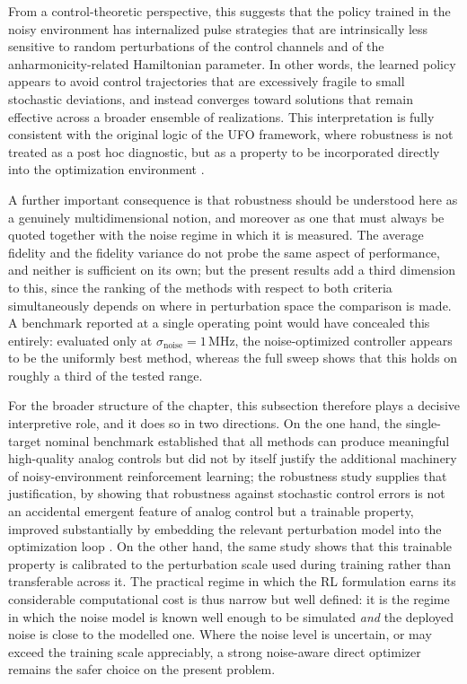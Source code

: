 From a control-theoretic perspective, this suggests that the policy trained in the noisy environment has internalized pulse strategies that are intrinsically less sensitive to random perturbations of the control channels and of the anharmonicity-related Hamiltonian parameter. In other words, the learned policy appears to avoid control trajectories that are excessively fragile to small stochastic deviations, and instead converges toward solutions that remain effective across a broader ensemble of realizations. This interpretation is fully consistent with the original logic of the UFO framework, where robustness is not treated as a post hoc diagnostic, but as a property to be incorporated directly into the optimization environment \cite{Niu2019}.

A further important consequence is that robustness should be understood here as a genuinely multidimensional notion, and moreover as one that must always be quoted together with the noise regime in which it is measured. The average fidelity and the fidelity variance do not probe the same aspect of performance, and neither is sufficient on its own; but the present results add a third dimension to this, since the ranking of the methods with respect to both criteria simultaneously depends on where in perturbation space the comparison is made. A benchmark reported at a single operating point would have concealed this entirely: evaluated only at \(\sigma_{\mathrm{noise}}=1\,\mathrm{MHz}\), the noise-optimized controller appears to be the uniformly best method, whereas the full sweep shows that this holds on roughly a third of the tested range.

For the broader structure of the chapter, this subsection therefore plays a decisive interpretive role, and it does so in two directions. On the one hand, the single-target nominal benchmark established that all methods can produce meaningful high-quality analog controls but did not by itself justify the additional machinery of noisy-environment reinforcement learning; the robustness study supplies that justification, by showing that robustness against stochastic control errors is not an accidental emergent feature of analog control but a trainable property, improved substantially by embedding the relevant perturbation model into the optimization loop \cite{Niu2019}. On the other hand, the same study shows that this trainable property is calibrated to the perturbation scale used during training rather than transferable across it. The practical regime in which the RL formulation earns its considerable computational cost is thus narrow but well defined: it is the regime in which the noise model is known well enough to be simulated \emph{and} the deployed noise is close to the modelled one. Where the noise level is uncertain, or may exceed the training scale appreciably, a strong noise-aware direct optimizer remains the safer choice on the present problem.

